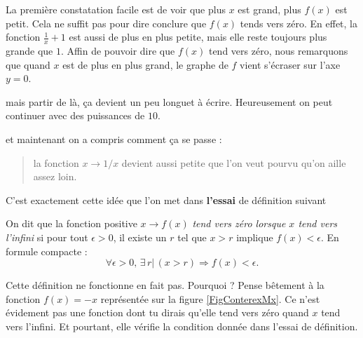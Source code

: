 La première constatation facile est de voir que plus $x$ est grand, plus $f(x)$ est petit. Cela ne suffit pas pour dire conclure que $f(x)$ tends vers zéro. En effet, la fonction $\frac{ 1 }{ x }+1$ est aussi de plus en plus petite, mais elle reste toujours plus grande que $1$. Affin de pouvoir dire que $f(x)$ tend vers zéro, nous remarquons que quand $x$ est de plus en plus grand, le graphe de $f$ vient s'écraser sur l'axe $y=0$.
\begin{itemize}
\end{itemize}
mais partir de là, ça devient un peu longuet à écrire. Heureusement on peut continuer avec des puissances de $10$.
\begin{itemize}
\end{itemize}
et maintenant on a compris comment ça se passe : 
\begin{quote}
la fonction $x\to 1/x$ devient aussi petite que l'on veut pourvu qu'on aille assez loin.
\end{quote}
C'est exactement cette idée que l'on met dans {\bf l'essai} de définition suivant
\begin{definition}\label{DefLimzepositinf}
On dit que la fonction positive $x\to f(x)$ \emph{tend vers zéro lorsque $x$ tend vers l'infini} si pour tout $\epsilon >0$, il existe un $r$ tel que $x>r$ implique $f(x)<\epsilon$. En formule compacte :
\begin{equation}
\forall \epsilon>0,\,\exists\, r|\,(x>r)\Rightarrow f(x)<\epsilon.
\end{equation}
\end{definition}
Cette définition ne fonctionne en fait pas. Pourquoi ? Pense bêtement à la fonction $f(x)=-x$ représentée sur la figure \ref{FigConterexMx}. Ce n'est évidement pas une fonction dont tu dirais qu'elle tend vers zéro quand $x$ tend vers l'infini. Et pourtant, elle vérifie la condition donnée dans l'essai de définition.


